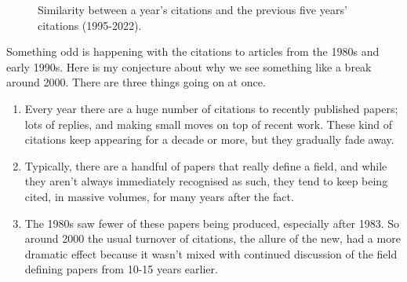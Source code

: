 \documentclass[
  10pt,
  letterpaper,
  DIV=11,
  numbers=noendperiod,
  twoside]{scrartcl}
\providecommand{\tightlist}{%
  \setlength{\itemsep}{0pt}\setlength{\parskip}{0pt}}\usepackage{longtable,booktabs,array}
\begin{document}
\begin{figure}


\caption{\label{fig-rolling-average-late}Similarity between a year's
citations and the previous five years' citations (1995-2022).}

\end{figure}%

Something odd is happening with the citations to articles from the 1980s
and early 1990s. Here is my conjecture about why we see something like a
break around 2000. There are three things going on at once.

\begin{enumerate}
\def\labelenumi{\arabic{enumi}.}
\tightlist
\item
  Every year there are a huge number of citations to recently published
  papers; lots of replies, and making small moves on top of recent work.
  These kind of citations keep appearing for a decade or more, but they
  gradually fade away.
\item
  Typically, there are a handful of papers that really define a field,
  and while they aren't always immediately recognised as such, they tend
  to keep being cited, in massive volumes, for many years after the
  fact.
\item
  The 1980s saw fewer of these papers being produced, especially after
  1983. So around 2000 the usual turnover of citations, the allure of
  the new, had a more dramatic effect because it wasn't mixed with
  continued discussion of the field defining papers from 10-15 years
  earlier.
\end{enumerate}
\end{document}
